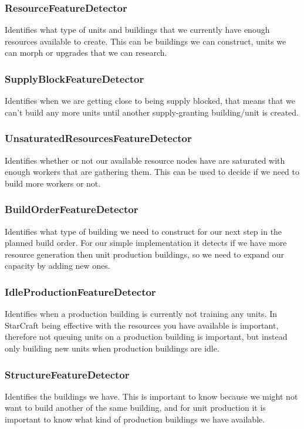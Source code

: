 \subsubsection{ResourceFeatureDetector}
Identifies what type of units and buildings that we currently have enough resources available to create. This can be buildings we can construct, units we can morph or upgrades that we can research.

\subsubsection{SupplyBlockFeatureDetector}
Identifies when we are getting close to being supply blocked, that means that we can't build any more units until another supply-granting building/unit is created.

\subsubsection{UnsaturatedResourcesFeatureDetector}
Identifies whether or not our available resource nodes have are saturated with enough workers that are gathering them. This can be used to decide if we need to build more workers or not.

\subsubsection{BuildOrderFeatureDetector}
Identifies what type of building we need to construct for our next step in the planned build order. For our simple implementation it detects if we have more resource generation then unit production buildings, so we need to expand our capacity by adding new ones.

\subsubsection{IdleProductionFeatureDetector}
Identifies when a production building is currently not training any units. In StarCraft being effective with the resources you have available is important, therefore not queuing units on a production building is important, but instead only building new units when production buildings are idle.

\subsubsection{StructureFeatureDetector}
Identifies the buildings we have. This is important to know because we might not want to build another of the same building, and for unit production it is important to know what kind of production buildings we have available.

